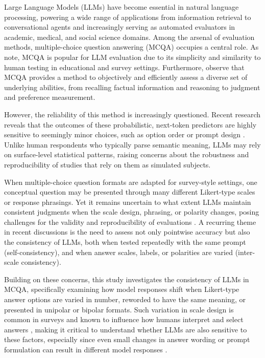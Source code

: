Large Language Models (LLMs) have become essential in natural language processing, powering a wide range of applications from information retrieval to conversational agents and increasingly serving as automated evaluators in academic, medical, and social science domains. Among the arsenal of evaluation methods, multiple-choice question answering (MCQA) occupies a central role. As \citet{balepur2025bestdescribesmcq} note, MCQA is popular for LLM evaluation due to its simplicity and similarity to human testing in educational and survey settings. Furthermore, \citet{mucciaccia2025automaticmcq} observe that MCQA provides a method to objectively and efficiently assess a diverse set of underlying abilities, from recalling factual information and reasoning to judgment and preference measurement.

However, the reliability of this method is increasingly questioned. Recent research reveals that the outcomes of these probabilistic, next-token predictors are highly sensitive to seemingly minor choices, such as option order or prompt design \citep{zheng2024largelanguagemodelsrobust, molfese2025rightanswerwrongscore}. Unlike human respondents who typically parse semantic meaning, LLMs may rely on surface-level statistical patterns, raising concerns about the robustness and reproducibility of studies that rely on them as simulated subjects.

\vspace{0.2cm}
When multiple-choice question formats are adapted for survey-style settings, one conceptual question may be presented through many different Likert-type scales or response phrasings. Yet it remains uncertain to what extent LLMs maintain consistent judgments when the scale design, phrasing, or polarity changes, posing challenges for the validity and reproducibility of evaluations \citep{lee2024evalconsistencyllmevaluators}. A recurring theme in recent discussions is the need to assess not only pointwise accuracy but also the consistency of LLMs, both when tested repeatedly with the same prompt (self-consistency), and when answer scales, labels, or polarities are varied (inter-scale consistency).

Building on these concerns, this study investigates the consistency of LLMs in MCQA, specifically examining how model responses shift when Likert-type answer options are varied in number, reworded to have the same meaning, or presented in unipolar or bipolar formats. Such variation in scale design is common in surveys and known to influence how humans interpret and select answers \citep[see, e.g.,][]{menold2021biasinagreementscales}, making it critical to understand whether LLMs are also sensitive to these factors, especially since even small changes in answer wording or prompt formulation can result in different model responses \citep{lunardi2025reliabilitybenchmarkllmevaluation}.

